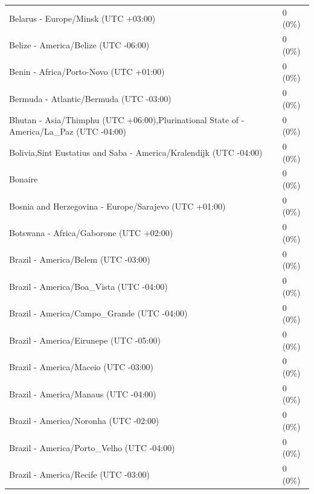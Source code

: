 \documentclass[
  english,
  man]{apa6}
\begin{document}
\begin{appendix}
\begin{table}
{\begin{tabular}[t]{ll}
\hspace{1em}Belarus - Europe/Minsk (UTC +03:00) & 0 (0\%)\\
\hspace{1em}Belize - America/Belize (UTC -06:00) & 0 (0\%)\\
\addlinespace
\hspace{1em}Benin - Africa/Porto-Novo (UTC +01:00) & 0 (0\%)\\
\hspace{1em}Bermuda - Atlantic/Bermuda (UTC -03:00) & 0 (0\%)\\
\hspace{1em}Bhutan - Asia/Thimphu (UTC +06:00),Plurinational State of - America/La\_Paz (UTC -04:00) & 0 (0\%)\\
\hspace{1em}Bolivia,Sint Eustatius and Saba - America/Kralendijk (UTC -04:00) & 0 (0\%)\\
\hspace{1em}Bonaire & 0 (0\%)\\
\addlinespace
\hspace{1em}Bosnia and Herzegovina - Europe/Sarajevo (UTC +01:00) & 0 (0\%)\\
\hspace{1em}Botswana - Africa/Gaborone (UTC +02:00) & 0 (0\%)\\
\hspace{1em}Brazil - America/Belem (UTC -03:00) & 0 (0\%)\\
\hspace{1em}Brazil - America/Boa\_Vista (UTC -04:00) & 0 (0\%)\\
\hspace{1em}Brazil - America/Campo\_Grande (UTC -04:00) & 0 (0\%)\\
\addlinespace
\hspace{1em}Brazil - America/Eirunepe (UTC -05:00) & 0 (0\%)\\
\hspace{1em}Brazil - America/Maceio (UTC -03:00) & 0 (0\%)\\
\hspace{1em}Brazil - America/Manaus (UTC -04:00) & 0 (0\%)\\
\hspace{1em}Brazil - America/Noronha (UTC -02:00) & 0 (0\%)\\
\hspace{1em}Brazil - America/Porto\_Velho (UTC -04:00) & 0 (0\%)\\
\addlinespace
\hspace{1em}Brazil - America/Recife (UTC -03:00) & 0 (0\%)\\

\end{tabular}}
\end{table}
\end{appendix}
\end{document}
